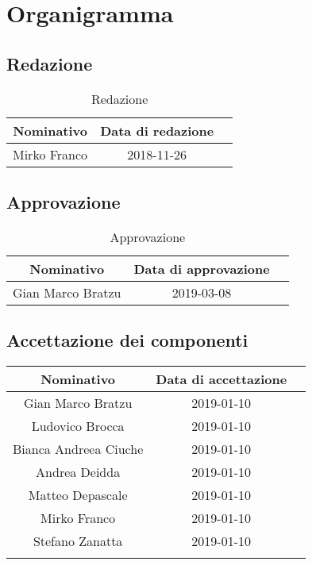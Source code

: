 \chapter{Organigramma}
\section{Redazione}
\label{redazione}
	\begin{table}[htp]
		\centering
			\begin{tabular}{|c|c|c|}
				\hline
				\textbf{Nominativo} & \textbf{Data di redazione} \\
				\hline 
				Mirko Franco & 2018-11-26 \\
				\hline
			\end{tabular}
				\caption{Redazione}
	\end{table}
\section{Approvazione}
\begin{table}[htp]
	\centering
	\begin{tabular}{|c|c|c|}
		\hline
		\textbf{Nominativo} & \textbf{Data di approvazione} \\
		\hline 
		Gian Marco Bratzu & 2019-03-08 \\
		\hline
	\end{tabular}
	\caption{Approvazione}
\end{table}
\clearpage
\section{Accettazione dei componenti}
\label{accettazione}
\begin{tabularx}{\textwidth}{|c|c|c|}
			\hline
			\textbf{Nominativo} & \textbf{Data di accettazione} \\
			\hline 
			Gian Marco Bratzu & 2019-01-10 \\
			Ludovico Brocca & 2019-01-10 \\
			Bianca  Andreea Ciuche & 2019-01-10 \\
			Andrea Deidda & 2019-01-10 \\
			Matteo Depascale & 2019-01-10 \\
	 		Mirko Franco & 2019-01-10 \\
	 		Stefano Zanatta & 2019-01-10 \\
			\hline
		\caption{Accettazione dei componenti}
\end{tabularx}
